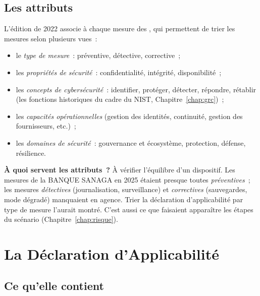 \subsection{Les attributs}

L'édition de 2022 associe à chaque mesure des , qui permettent de trier les mesures selon plusieurs vues~:
\begin{itemize}
    \item le \emph{type de mesure}~: préventive, détective, corrective~;
    \item les \emph{propriétés de sécurité}~: confidentialité, intégrité,
          disponibilité~;
    \item les \emph{concepts de cybersécurité}~: identifier, protéger,
          détecter, répondre, rétablir (les fonctions historiques du cadre
          du NIST, Chapitre~\ref{chap:grc})~;
    \item les \emph{capacités opérationnelles} (gestion des identités,
          continuité, gestion des fournisseurs, etc.)~;
    \item les \emph{domaines de sécurité}~: gouvernance et écosystème,
          protection, défense, résilience.
\end{itemize}

\begin{boxinfo}
\textbf{À quoi servent les attributs~?} À vérifier l'équilibre d'un
dispositif. Les mesures de la BANQUE SANAGA en 2025 étaient presque toutes
\emph{préventives}~; les mesures \emph{détectives} (journalisation,
surveillance) et \emph{correctives} (sauvegardes, mode dégradé) manquaient
en agence. Trier la déclaration d'applicabilité par type de mesure l'aurait
montré. C'est aussi ce que faisaient apparaître les étapes du scénario
(Chapitre~\ref{chap:risque}).
\end{boxinfo}

\section{La Déclaration d'Applicabilité}
\label{sec:c08-dda}

\subsection{Ce qu'elle contient}

